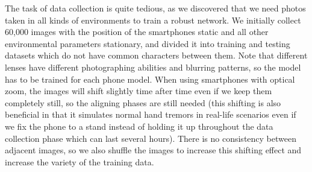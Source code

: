 The task of data collection is quite tedious, as we discovered that we need photos taken in all kinds of environments to train a robust network. We initially collect 60,000 images with the position of the smartphones static and all other environmental parameters stationary, and divided it into training and testing datasets which do not have common characters between them. Note that different lenses have different photographing abilities and blurring patterns, so the model has to be trained for each phone model. When using smartphones with optical zoom, the images will shift slightly time after time even if we keep them completely still, so the aligning phases are still needed (this shifting is also beneficial in that it simulates normal hand tremors in real-life scenarios even if we fix the phone to a stand instead of holding it up throughout the data collection phase which can last several hours). There is no consistency between adjacent images, so we also shuffle the images to increase this shifting effect and increase the variety of the training data. %

